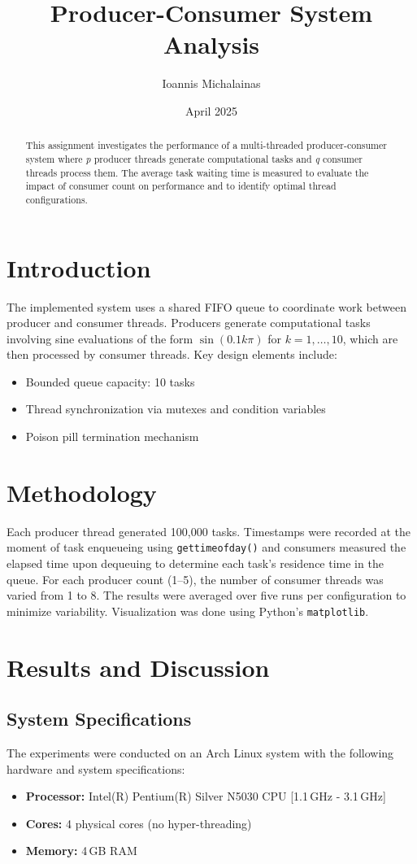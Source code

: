 \documentclass{article}
\title{Producer-Consumer System Analysis}
\author{Ioannis Michalainas}
\date{April 2025}
\begin{document}
\maketitle

\begin{abstract}
This assignment investigates the performance of a multi-threaded producer-consumer system where \textit{p} producer threads generate computational tasks and \textit{q} consumer threads process them. The average task waiting time is measured to evaluate the impact of consumer count on performance and to identify optimal thread configurations.
\end{abstract}

\section{Introduction}
The implemented system uses a shared FIFO queue to coordinate work between producer and consumer threads. Producers generate computational tasks involving sine evaluations of the form $\sin(0.1k\pi)$ for $k = 1,\ldots,10$, which are then processed by consumer threads. Key design elements include:
\begin{itemize}
    \item Bounded queue capacity: 10 tasks
    \item Thread synchronization via mutexes and condition variables
    \item Poison pill termination mechanism
\end{itemize}

\section{Methodology}
Each producer thread generated 100{,}000 tasks. Timestamps were recorded at the moment of task enqueueing using \texttt{gettimeofday()} and consumers measured the elapsed time upon dequeuing to determine each task’s residence time in the queue. For each producer count (1--5), the number of consumer threads was varied from 1 to 8. The results were averaged over five runs per configuration to minimize variability. Visualization was done using Python's \texttt{matplotlib}.

\section{Results and Discussion}

\subsection{System Specifications}
The experiments were conducted on an Arch Linux system with the following hardware and system specifications:
\begin{itemize}
    \item \textbf{Processor:} Intel(R) Pentium(R) Silver N5030 CPU [1.1\,GHz - 3.1\,GHz]
    \item \textbf{Cores:} 4 physical cores (no hyper-threading)
    \item \textbf{Memory:} 4\,GB RAM
\end{itemize}
\end{document}
